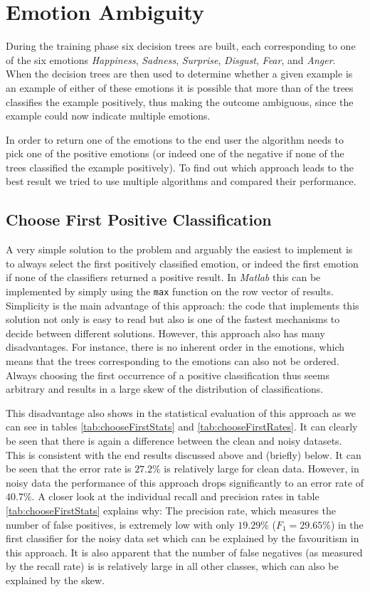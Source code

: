 \documentclass[11pt,a4paper]{article}
\begin{document}
\section{Emotion Ambiguity}

During the training phase six decision trees are built, each corresponding to one of the six emotions \emph{Happiness}, \emph{Sadness}, \emph{Surprise}, \emph{Disgust}, \emph{Fear}, and \emph{Anger}. When the decision trees are then used to determine whether a given example is an example of either of these emotions it is possible that more than of the trees classifies the example positively, thus making the outcome ambiguous, since the example could now indicate multiple emotions. 

In order to return one of the emotions to the end user the algorithm needs to pick one of the positive emotions (or indeed one of the negative if none of the trees classified the example positively). To find out which approach leads to the best result we tried to use multiple algorithms and compared their performance.

\subsection{Choose First Positive Classification}

A very simple solution to the problem and arguably the easiest to implement is to always select the first positively classified emotion, or indeed the first emotion if none of the classifiers returned a positive result. In \emph{Matlab} this can be implemented by simply using the \texttt{max} function on the row vector of results. Simplicity is the main advantage of this approach: the code that implements this solution not only is easy to read but also is one of the fastest mechanisms to decide between different solutions. However, this approach also has many disadvantages. For instance, there is no inherent order in the emotions, which means that the trees corresponding to the emotions can also not be ordered. Always choosing the first occurrence of a positive classification thus seems arbitrary and results in a large skew of the distribution of classifications.

This disadvantage also shows in the statistical evaluation of this approach as we can see in tables \ref{tab:chooseFirstStats} and \ref{tab:chooseFirstRates}. It can clearly be seen that there is again a difference between the clean and noisy datasets. This is consistent with the end results discussed above and (briefly) below. It can be seen that the error rate is $27.2\%$ is relatively large for clean data. However, in noisy data the performance of this approach drops significantly to an error rate of $40.7\%$. A closer look at the individual recall and precision rates in table \ref{tab:chooseFirstStats} explains why: The precision rate, which measures the number of false positives, is extremely low with only $19.29\%$ ($F_1 = 29.65\%$) in the first classifier for the noisy data set which can be explained by the favouritism in this approach. It is also apparent that the number of false negatives (as measured by the recall rate) is is relatively large in all other classes, which can also  be explained by the skew.
\end{document}
